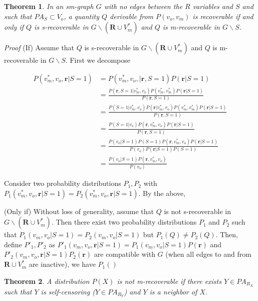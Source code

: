 \documentclass[12pt,twoside]{reedthesis}
\newtheorem{theorem}{Theorem}
\theoremstyle{definition}
\begin{document}
\begin{theorem}
In an sm-graph $G$ with no edges between the $R$ variables and $S$ and such that $PA_S \subset V_o$, a quantity $Q$ derivable from $P(v_o, v_m)$ is recoverable if and only if $Q$ is s-recoverable in $G \backslash (\mathbf{R}  \cup V_m^*)$ and $Q$ is m-recoverable in $G \backslash S$.
\end{theorem}

\emph{Proof} (If) Assume that $Q$  is s-recoverable in $G \backslash (\mathbf{R}  \cup V_m^*)$ and $Q$ is m-recoverable in $G \backslash S$. First we decompose 

\begin{align*}
P(v_m^*, v_o, \mathbf{r} | S = 1) &= P(v_m^*, v_o, |  \mathbf{r}, S = 1) P( \mathbf{r} | S= 1) \\
&= \frac{P( \mathbf{r}, S = 1 | v_m^*, v_o)P(v_m^*, v_m^*) P( \mathbf{r} | S= 1)}{ P(\mathbf{r} , S= 1)} \\
&= \frac{P(S = 1 | v_m^*, v_o)P( \mathbf{r} | v_m^*, v_o)P(v_m^*, v_m^*) P( \mathbf{r} | S= 1)}{P( \mathbf{r} , S= 1)} \\
&= \frac{P(S = 1 |  v_o)P( \mathbf{r}, v_m^*, v_o) P( \mathbf{r} | S= 1)}{P( \mathbf{r} , S= 1)} \\
&= \frac{P(v_o | S = 1) P(S = 1) P( \mathbf{r}, v_m^*, v_o) P( \mathbf{r} | S= 1)}{P(v_o) P(\mathbf{r} | S= 1)P(S = 1)} \\
&= \frac{P(v_o | S = 1) P( \mathbf{r}, v_m^*, v_o) }{P(v_o)}  
\end{align*}

Consider two probability distributions $P_1, P_2$ with $P_1(v_m^*, v_o, \mathbf{r} | S = 1) = P_2(v_m^*, v_o, \mathbf{r} | S = 1)$. By the above, 

(Only if) Without loss of generality, assume that $Q$ is not s-recoverable in $G \backslash (\mathbf{R} \cup V_m^*)$. Then there exist two probability distributions $P_1$ and $P_2$ such that $P_1(v_m, v_o | S = 1) = P_2(v_m, v_o | S = 1)$ but $P_1(Q) \neq P_2(Q)$. Then, define $P'_1, P'_2$ as $P'_1(v_m, v_o, \mathbf{r} | S = 1) = P_1(v_m, v_o | S = 1)P(\mathbf{r})$ and $P'_2(v_m, v_o, \mathbf{r} | S = 1)P_2(\mathbf{r})$ are compatible with $G$ (when all edges to and from $\mathbf{R} \cup V_m^*$ are inactive), we have $P_1()$

\begin{theorem}
A distribution $P(X)$ is not m-recoverable if there exists $Y \in PA_{R_X}$ such that $Y$ is self-censoring ($Y \in PA_{R_Y}$) and $Y$ is a neighbor of $X$.
\end{theorem}
\end{document}
